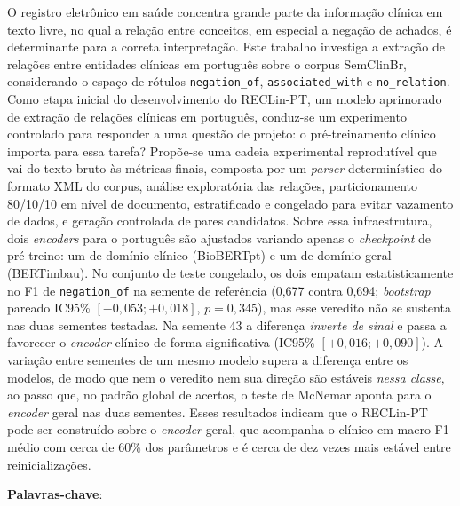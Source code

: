 \begin{resumo}
  \vspace{-15pt}

  O registro eletrônico em saúde concentra grande parte da informação clínica em
  texto livre, no qual a relação entre conceitos, em especial a negação de
  achados, é determinante para a correta interpretação. Este trabalho investiga
  a extração de relações entre entidades clínicas em português sobre o corpus
  SemClinBr, considerando o espaço de rótulos \texttt{negation\_of},
  \texttt{associated\_with} e \texttt{no\_relation}. Como etapa inicial do
  desenvolvimento do RECLin-PT, um modelo aprimorado de extração de relações
  clínicas em português, conduz-se um experimento controlado para responder a uma
  questão de projeto: o pré-treinamento clínico importa para essa tarefa? Propõe-se
  uma cadeia experimental reprodutível que vai do texto bruto às métricas finais,
  composta por um \emph{parser} determinístico do formato XML do corpus, análise
  exploratória das relações, particionamento 80/10/10 em nível de documento,
  estratificado e congelado para evitar vazamento de dados, e geração
  controlada de pares candidatos. Sobre essa infraestrutura, dois \emph{encoders}
  para o português são ajustados variando apenas o \emph{checkpoint} de
  pré-treino: um de domínio clínico (BioBERTpt) e um de domínio geral (BERTimbau).
  No conjunto de teste congelado, os dois empatam estatisticamente no F1 de
  \texttt{negation\_of} na semente de referência (0,677 contra 0,694;
  \emph{bootstrap} pareado IC95\% $[-0{,}053; +0{,}018]$, $p=0{,}345$), mas esse
  veredito não se sustenta nas duas sementes testadas. Na semente 43 a diferença
  \emph{inverte de sinal} e passa a favorecer o \emph{encoder} clínico de forma
  significativa (IC95\% $[+0{,}016; +0{,}090]$). A variação entre sementes de um
  mesmo modelo supera a diferença entre os modelos, de modo que nem o veredito
  nem sua direção são estáveis \emph{nessa classe}, ao passo que, no padrão
  global de acertos, o teste de McNemar aponta para o \emph{encoder} geral nas
  duas sementes. Esses resultados indicam que o RECLin-PT pode ser
  construído sobre o \emph{encoder} geral, que acompanha o clínico em macro-F1
  médio com cerca de 60\% dos parâmetros e é cerca de dez vezes mais estável
  entre reinicializações.

  \vspace{\onelineskip}

  \noindent\textbf{Palavras-chave}: \palavraschaveemlinha
\end{resumo}

